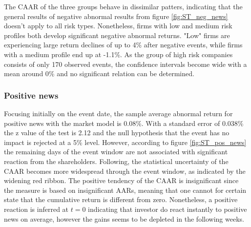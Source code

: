 The CAAR of the three groups behave in dissimilar patters, indicating that the general results of negative abnormal results from figure \ref{fig:ST_neg_news} doesn't apply to all risk types.
Nonetheless, firms with low and medium risk profiles both develop significant negative abnormal returns. "Low" firms are experiencing large return declines of up to 4\% after negative events, while firms with a medium profile end up at -1.1\%. As the group of high risk companies consists of only 170 observed events, the confidence intervals become wide with a mean around 0\% and no significant relation can be determined. 



\subsubsection{Positive news}

Focusing initially on the event date, the sample average abnormal return for positive news with the market model is 0.08\%. With a standard error of 0.038\% the z value of the test is 2.12 and the null hypothesis that the event has no impact is rejected at a 5\% level. However, according to figure \ref{fig:ST_pos_news} the remaining days of the event window are not associated with significant reaction  from the shareholders. Following, the statistical uncertainty of the CAAR becomes more widespread through the event window, as indicated by the widening red ribbon. The positive tendency of the CAAR is insignificant since the measure is based on insignificant AARs, meaning that one cannot for certain state that the cumulative return is different from zero. Nonetheless, a positive reaction is inferred at $t=0$ indicating that investor do react instantly to positive news on average, however the gains seems to be depleted in the following weeks.  

